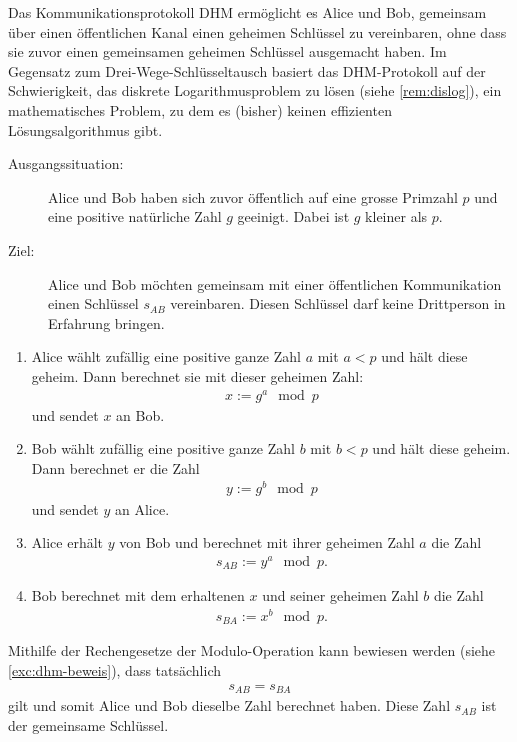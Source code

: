 \begin{myprocedure}\label{myprocedure:Diffie}
	Das Kommunikationsprotokoll \gls{DHM} ermöglicht es Alice und Bob, gemeinsam über einen öffentlichen Kanal einen geheimen Schlüssel zu vereinbaren, ohne dass sie zuvor einen gemeinsamen geheimen Schlüssel ausgemacht haben. Im Gegensatz zum Drei-Wege-Schlüsseltausch basiert das \gls{DHM}-Protokoll auf der Schwierigkeit, das diskrete Logarithmusproblem zu lösen (siehe \cref{rem:dislog}), ein mathematisches Problem, zu dem es (bisher) keinen effizienten Lösungsalgorithmus gibt.
	\begin{description}
		\item[Ausgangssituation:] Alice und Bob haben sich zuvor öffentlich auf eine grosse Primzahl $p$ und eine positive natürliche Zahl $g$ geeinigt. Dabei ist $g$ kleiner als $p$.
		\item[Ziel:] Alice und Bob möchten gemeinsam mit einer öffentlichen Kommunikation einen Schlüssel $s_{AB}$ vereinbaren. Diesen Schlüssel darf keine Drittperson in Erfahrung bringen.
	\end{description}
	\begin{enumerate}
		\item Alice wählt zufällig eine positive ganze Zahl $a$ mit $a<p$ und hält diese geheim. Dann berechnet sie mit dieser geheimen Zahl:
		      \begin{align*}
			      x := g^a\mod p
		      \end{align*}
		      und sendet $x$ an Bob.
		\item Bob wählt zufällig eine positive ganze Zahl $b$ mit $b<p$ und hält diese geheim. Dann berechnet er die Zahl
		      \begin{align*}
			      y := g^b\mod p
		      \end{align*}
		      und sendet $y$ an Alice.
		\item Alice erhält $y$ von Bob und berechnet mit ihrer geheimen Zahl $a$ die Zahl
		      \begin{align*}
			      s_{AB} := y^a\mod p.
		      \end{align*}
		\item Bob berechnet mit dem erhaltenen $x$ und seiner geheimen Zahl $b$ die Zahl
		      \begin{align*}
			      s_{BA} := x^b\mod p.
		      \end{align*}
	\end{enumerate}
	Mithilfe der Rechengesetze der Modulo-Operation kann bewiesen werden (siehe \cref{exc:dhm-beweis}), dass tatsächlich
	\begin{align*}
		s_{AB} = s_{BA}
	\end{align*}
	gilt und somit Alice und Bob dieselbe Zahl berechnet haben. Diese Zahl $s_{AB}$ ist der gemeinsame Schlüssel.
\end{myprocedure}

